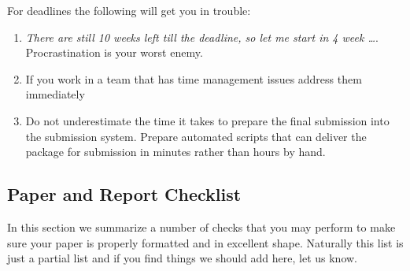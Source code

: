 For deadlines the following will get you in trouble:

\begin{enumerate}

\item
  \emph{There are still 10 weeks left till the deadline, so let me start
  in 4 week \ldots{}}. Procrastination is your worst enemy.
\item
  If you work in a team that has time management issues address them
  immediately
\item
  Do not underestimate the time it takes to prepare the final submission
  into the submission system. Prepare automated scripts that can deliver
  the package for submission in minutes rather than hours by hand.
\end{enumerate}

\subsection{Paper and Report Checklist}\label{paper-checklist}

In this section we summarize a number of checks that you may perform to
make sure your paper is properly formatted and in excellent shape.
Naturally this list is just a partial list and if you find things we
should add here, let us know.

